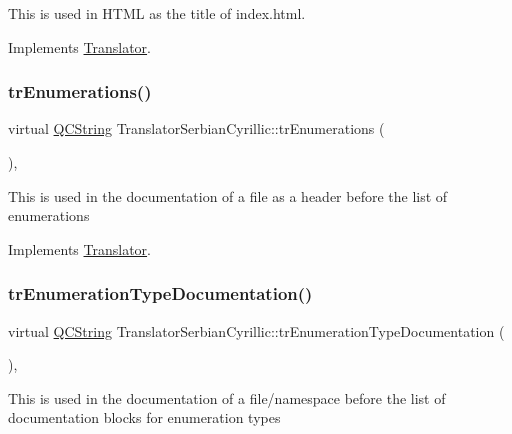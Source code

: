 This is used in H\+T\+ML as the title of index.\+html. 

Implements \mbox{\hyperlink{class_translator}{Translator}}.

\mbox{\label{class_translator_serbian_cyrillic_a895e64ba1a9aede0bc925e09a5c5b449}} 
\subsubsection{\texorpdfstring{trEnumerations()}{trEnumerations()}}
{\footnotesize\ttfamily virtual \mbox{\hyperlink{class_q_c_string}{Q\+C\+String}} Translator\+Serbian\+Cyrillic\+::tr\+Enumerations (\begin{DoxyParamCaption}{ }\end{DoxyParamCaption})\hspace{0.3cm}{\ttfamily [inline]}, {\ttfamily [virtual]}}

This is used in the documentation of a file as a header before the list of enumerations 

Implements \mbox{\hyperlink{class_translator}{Translator}}.

\mbox{\label{class_translator_serbian_cyrillic_a84a8e172afd5948ae3e9d945b86c54ef}} 
\subsubsection{\texorpdfstring{trEnumerationTypeDocumentation()}{trEnumerationTypeDocumentation()}}
{\footnotesize\ttfamily virtual \mbox{\hyperlink{class_q_c_string}{Q\+C\+String}} Translator\+Serbian\+Cyrillic\+::tr\+Enumeration\+Type\+Documentation (\begin{DoxyParamCaption}{ }\end{DoxyParamCaption})\hspace{0.3cm}{\ttfamily [inline]}, {\ttfamily [virtual]}}

This is used in the documentation of a file/namespace before the list of documentation blocks for enumeration types 

